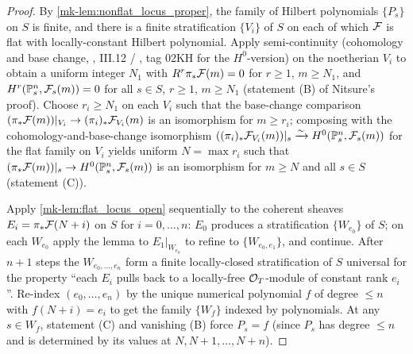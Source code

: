 \begin{proof}
  By \ref{mk-lem:nonflat_locus_proper}, the family of Hilbert polynomials
  \(\{P_s\}\) on \(S\) is finite, and there is a finite stratification
  \(\{V_i\}\) of \(S\) on each of which \(\mathcal{F}\) is flat with locally-constant
  Hilbert polynomial.  Apply semi-continuity (cohomology and base change,
  \cite{hartshorne-ag}, III.12 / \cite{stacks-project}, tag 02KH for the \(H^0\)-version) on
  the noetherian \(V_i\) to obtain a uniform integer \(N_1\) with
  \(R^r \pi_* \mathcal{F}(m) = 0\) for \(r \ge 1\), \(m \ge N_1\), and \(H^r(\mathbb{P}^n_s, \mathcal{F}_s(m)) = 0\)
  for all \(s \in S\), \(r \ge 1\), \(m \ge N_1\) (statement (B) of Nitsure's proof).
  Choose \(r_i \ge N_1\) on each \(V_i\) such that the base-change comparison
  \((\pi_* \mathcal{F}(m))|_{V_i} \to (\pi_i)_* \mathcal{F}_{V_i}(m)\) is an isomorphism for
  \(m \ge r_i\); composing with the cohomology-and-base-change isomorphism
  \(((\pi_i)_* \mathcal{F}_{V_i}(m))|_s \xrightarrow{\sim} H^0(\mathbb{P}^n_s, \mathcal{F}_s(m))\) for
  the flat family on \(V_i\) yields uniform \(N = \max r_i\) such that
  \((\pi_* \mathcal{F}(m))|_s \to H^0(\mathbb{P}^n_s, \mathcal{F}_s(m))\) is an isomorphism for \(m \ge N\)
  and all \(s \in S\) (statement (C)).

  Apply \ref{mk-lem:flat_locus_open} sequentially to the coherent sheaves
  \(E_i = \pi_* \mathcal{F}(N+i)\) on \(S\) for \(i = 0, \dots, n\): \(E_0\) produces a
  stratification \(\{W_{e_0}\}\) of \(S\); on each \(W_{e_0}\) apply the lemma to
  \(E_1|_{W_{e_0}}\) to refine to \(\{W_{e_0, e_1}\}\), and continue. After \(n+1\)
  steps the \(W_{e_0, \dots, e_n}\) form a finite locally-closed stratification
  of \(S\) universal for the property ``each \(E_i\) pulls back to a locally-free
  \(\mathcal{O}_T\)-module of constant rank \(e_i\)''.  Re-index \((e_0, \dots, e_n)\) by the
  unique numerical polynomial \(f\) of degree \(\le n\) with \(f(N+i) = e_i\) to get
  the family \(\{W_f\}\) indexed by polynomials.  At any \(s \in W_f\), statement
  (C) and vanishing (B) force \(P_s = f\) (since \(P_s\) has degree \(\le n\) and is
  determined by its values at \(N, N+1, \dots, N+n\)).


\end{proof}
